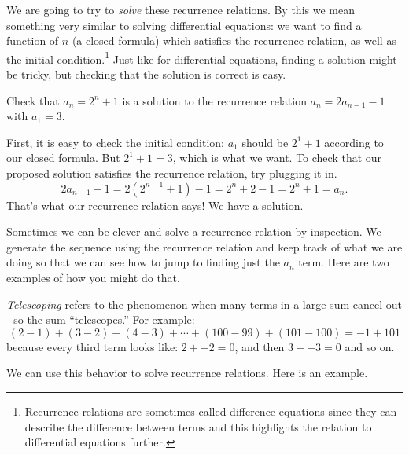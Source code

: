 \documentclass[12pt]{article}
\begin{document}
We are going to try to {\em solve} these recurrence relations.  By this we mean something very similar to solving differential equations: we want to find a function of $n$ (a closed formula) which satisfies the recurrence relation, as well as the initial condition.\footnote{Recurrence relations are sometimes called difference equations since they can describe the difference between terms and this highlights the relation to differential equations further.} Just like for differential equations, finding a solution might be tricky, but checking that the solution is correct is easy.

 \begin{example}
    Check that $a_n = 2^n + 1$ is a solution to the recurrence relation $a_n = 2a_{n-1} - 1$ with $a_1 = 3$.
    \begin{solution}
      First, it is easy to check the initial condition: $a_1$ should be $2^1 + 1$ according to our closed formula.  But $2^1 + 1 = 3$, which is what we want.  To check that our proposed solution satisfies the recurrence relation, try plugging it in.
      \[2a_{n-1} - 1 = 2(2^{n-1} + 1) - 1 = 2^n + 2 - 1 = 2^n +1 = a_n.\]
      That's what our recurrence relation says!  We have a solution.
    \end{solution}

 \end{example}



Sometimes we can be clever and solve a recurrence relation by inspection.  We generate the sequence using the recurrence relation and keep track of what we are doing so that we can see how to jump to finding just the $a_n$ term.  Here are two examples of how you might do that.
%

{\em Telescoping} refers to the phenomenon when many terms in a large sum cancel out - so the sum ``telescopes.''  For example:
\[(2 - 1) + (3 - 2) + (4 - 3) + \cdots + (100 - 99) + (101 - 100) = -1 + 101\]
because every third term looks like: $2 + -2 = 0$, and then $3 + -3 = 0$ and so on.

We can use this behavior to solve recurrence relations.  Here is an example.
\end{document}
